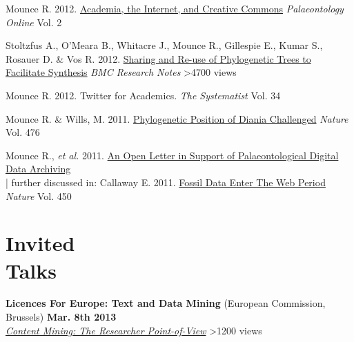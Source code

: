 \documentclass[margin,line]{resume}
\begin{document}
\begin{resume}
\vspace{-2mm}
    Mounce R. 2012.  \href{http://www.palaeontologyonline.com/articles/2012/life-as-a-palaeontologist-academia-the-internet-and-creative-commons/}{Academia, the Internet, and Creative Commons} \textsl{Palaeontology Online} Vol. 2

\vspace{-2mm}
    Stoltzfus A., O'Meara B., Whitacre J., Mounce R., Gillespie E., Kumar S., Rosauer D. \& Vos R. 2012. \href{http://dx.doi.org/10.1186/1756-0500-5-574}{Sharing and Re-use of Phylogenetic Trees to Facilitate Synthesis} \textsl{BMC Research Notes} \hfill {\color{red} \textgreater4700 views}

\vspace{-2mm}
    Mounce R. 2012. Twitter for Academics.
    \textsl{The Systematist} Vol. 34

\vspace{-2mm}
    Mounce R. \& Wills, M. 2011. \href{http://dx.doi.org/10.1038/nature10266}{Phylogenetic Position of Diania Challenged}
    \textsl{Nature} Vol. 476

\vspace{-2mm}
    Mounce R., \textsl{et al.} 2011.
    \href{http://www.supportpalaeodataarchiving.co.uk/}{An Open Letter in Support of Palaeontological Digital Data Archiving} \\

\vspace{-6.5 mm} 
\vspace{-2mm} | further discussed in: Callaway E. 2011. \href{http://www.nature.com/news/2011/110411/full/472150a.html}{Fossil Data Enter The Web Period} \textsl{Nature} Vol. 450\\

\vspace{-7 mm}

    \section{\mysidestyle Invited\\Talks}

\textbf{Licences For Europe: Text and Data Mining} (European Commission, Brussels) \hfill \textbf{Mar. 8th 2013}\\
    \textsl{\href{http://www.slideshare.net/rossmounce/content-mining}{Content Mining: The Researcher Point-of-View}}  \hfill {\color{red}     	\textgreater 1200 views} \\ 


\end{resume}
\end{document}
